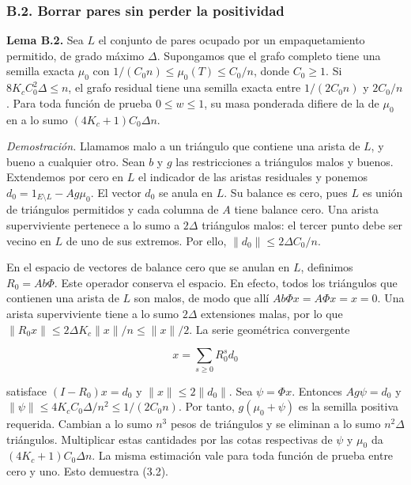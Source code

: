 \documentclass[spanish,11pt,a4paper]{article}
\begin{document}
\subsubsection{B.2. Borrar pares sin perder la positividad}\label{b.2.-borrar-pares-sin-perder-la-positividad}

\textbf{Lema B.2.} Sea \(L\) el conjunto de pares ocupado por un empaquetamiento permitido, de grado máximo \(\Delta\). Supongamos que el grafo completo tiene una semilla exacta \(\mu_0\) con \(1/(C_0n)\le\mu_0(T)\le C_0/n\), donde \(C_0\ge1\). Si \(8K_cC_0^2\Delta\le n\), el grafo residual tiene una semilla exacta entre \(1/(2C_0n)\) y \(2C_0/n\). Para toda función de prueba \(0\le w\le1\), su masa ponderada difiere de la de \(\mu_0\) en a lo sumo \((4K_c+1)C_0\Delta n\).

\emph{Demostración.} Llamamos malo a un triángulo que contiene una arista de \(L\), y bueno a cualquier otro. Sean \(b\) y \(g\) las restricciones a triángulos malos y buenos. Extendemos por cero en \(L\) el indicador de las aristas residuales y ponemos \(d_0=1_{E\setminus L}-Ag\mu_0\). El vector \(d_0\) se anula en \(L\). Su balance es cero, pues \(L\) es unión de triángulos permitidos y cada columna de \(A\) tiene balance cero. Una arista superviviente pertenece a lo sumo a \(2\Delta\) triángulos malos: el tercer punto debe ser vecino en \(L\) de uno de sus extremos. Por ello, \(\|d_0\|\le2\Delta C_0/n\).

En el espacio de vectores de balance cero que se anulan en \(L\), definimos \(R_0=Ab\Phi\). Este operador conserva el espacio. En efecto, todos los triángulos que contienen una arista de \(L\) son malos, de modo que allí \(Ab\Phi x=A\Phi x=x=0\). Una arista superviviente tiene a lo sumo \(2\Delta\) extensiones malas, por lo que \(\|R_0x\|\le2\Delta K_c\|x\|/n\le\|x\|/2\). La serie geométrica convergente

\[x=\sum_{s\ge0}R_0^s d_0\]

satisface \((I-R_0)x=d_0\) y \(\|x\|\le2\|d_0\|\). Sea \(\psi=\Phi x\). Entonces \(Ag\psi=d_0\) y \(\|\psi\|\le4K_cC_0\Delta/n^2\le1/(2C_0n)\). Por tanto, \(g(\mu_0+\psi)\) es la semilla positiva requerida. Cambian a lo sumo \(n^3\) pesos de triángulos y se eliminan a lo sumo \(n^2\Delta\) triángulos. Multiplicar estas cantidades por las cotas respectivas de \(\psi\) y \(\mu_0\) da \((4K_c+1)C_0\Delta n\). La misma estimación vale para toda función de prueba entre cero y uno. Esto demuestra (3.2).
\end{document}
